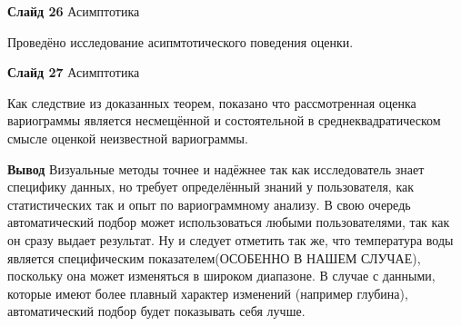 \documentclass[a4paper,10pt]{report}
\begin{document}
\textbf{Слайд 26} Асимптотика

Проведёно исследование асипмтотического поведения оценки.

\textbf{Слайд 27} Асимптотика

Как следствие из доказанных теорем, показано что рассмотренная оценка вариограммы является несмещённой и состоятельной в среднеквадратическом смысле оценкой неизвестной вариограммы.

\textbf{Вывод} Визуальные методы точнее и надёжнее так как исследователь знает специфику данных, но требует определённый знаний у пользователя, как статистических так и опыт по вариограммному анализу. В свою очередь автоматический подбор может использоваться любыми пользователями, так как он сразу выдает результат. Ну и следует отметить так же, что температура воды является специфическим показателем(ОСОБЕННО В НАШЕМ СЛУЧАЕ), поскольку она может изменяться в широком диапазоне. В случае с данными, которые имеют более плавный характер изменений (например глубина), автоматический подбор будет показывать себя лучше.
\end{document}
